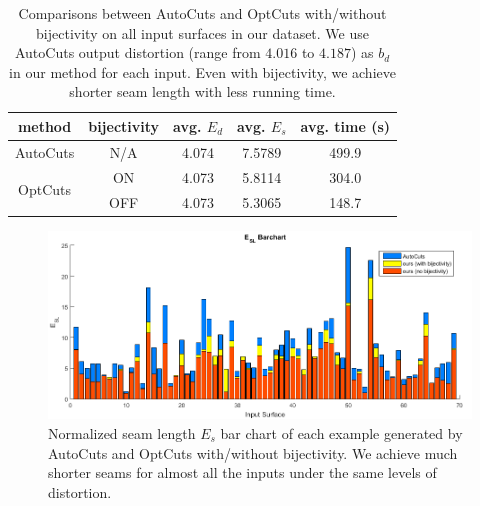 \begin{table}[!h]
\centering
\caption{Comparisons between AutoCuts and OptCuts with/without bijectivity on all input surfaces in our dataset. We use AutoCuts output distortion (range from $4.016$ to $4.187$) as $b_d$ in our method for each input. Even with bijectivity, we achieve shorter seam length with less running time.}
\label{tb:comp_AutoCuts}
\begin{tabular}{|c|c|c|c|c|}
\hline
method                   & bijectivity & avg. $E_{d}$ & avg. $E_{s}$ & avg. time (s) \\ \hline
AutoCuts                 & N/A         & 4.074        & 7.5789       & 499.9         \\ \hline
\multirow{2}{*}{OptCuts} & ON          & 4.073        & 5.8114       & 304.0         \\
                         & OFF         & 4.073        & 5.3065       & 148.7         \\ \hline
\end{tabular}
\end{table}

\begin{figure}[!h]
\centering
\includegraphics[width=\linewidth]{fig/ESLBar_compAutoCuts.png}
\caption{Normalized seam length $E_{s}$ bar chart of each example generated by AutoCuts and OptCuts with/without bijectivity. We achieve much shorter seams for almost all the inputs under the same levels of distortion.}
\label{fig:ESLBar_compAutoCuts}
\end{figure}


